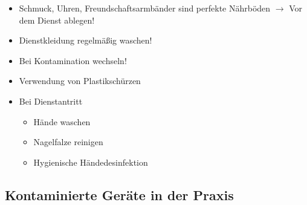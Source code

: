 \begin{itemize}
    \item Schmuck, Uhren, Freundschaftsarmbänder sind perfekte
    Nährböden ${\rightarrow}$ Vor dem Dienst ablegen!
    \item Dienstkleidung regelmäßig waschen!
    \item Bei Kontamination wechseln!
    \item Verwendung von Plastikschürzen
    \item Bei Dienstantritt
    \begin{itemize}
        \item Hände waschen
        \item Nagelfalze reinigen
        \item Hygienische Händedesinfektion
    \end{itemize}
\end{itemize}


% 
% 



\subsection{Kontaminierte Geräte in der Praxis}


